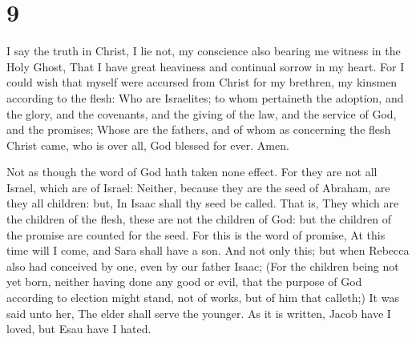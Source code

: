 \hypertarget{section-8}{%
\section{9}\label{section-8}}

 I say the truth in Christ, I lie not, my conscience also
bearing me witness in the Holy Ghost,  That I have great
heaviness and continual sorrow in my heart.  For I could
wish that myself were accursed from Christ for my brethren, my kinsmen
according to the flesh:  Who are Israelites; to whom
pertaineth the adoption, and the glory, and the covenants, and the
giving of the law, and the service of God, and the promises;
 Whose are the fathers, and of whom as concerning the
flesh Christ came, who is over all, God blessed for ever. Amen.

 Not as though the word of God hath taken none effect. For
they are not all Israel, which are of Israel:  Neither,
because they are the seed of Abraham, are they all children: but, In
Isaac shall thy seed be called.  That is, They which are
the children of the flesh, these are not the children of God: but the
children of the promise are counted for the seed.  For
this is the word of promise, At this time will I come, and Sara shall
have a son.  And not only this; but when Rebecca also had
conceived by one, even by our father Isaac;  (For the
children being not yet born, neither having done any good or evil, that
the purpose of God according to election might stand, not of works, but
of him that calleth;)  It was said unto her, The elder
shall serve the younger.  As it is written, Jacob have I
loved, but Esau have I hated.

